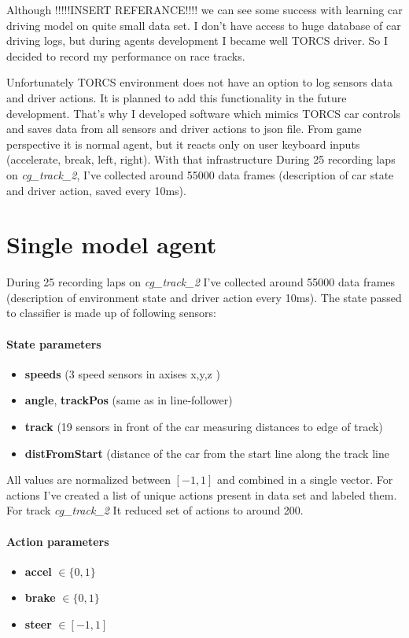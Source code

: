 \documentclass[declaration,shortabstract,english,inz]{iithesis}
\begin{document}
Although  !!!!!INSERT REFERANCE!!!! we can see some success with learning car driving model on quite small data set. I don't have access to huge database of car driving logs, but during agents development I became well TORCS driver. So I decided to record my performance on race tracks.

Unfortunately TORCS environment does not have an option to log sensors data and driver actions. It is planned to add this functionality in the future development. That's why I developed software which mimics TORCS car controls and saves data from all sensors and driver actions to json file. From game perspective it is normal agent, but it reacts only on user keyboard inputs (accelerate, break, left, right).  With that infrastructure During 25 recording laps on \textit{cg\_track\_2}, I've collected around 55000 data frames (description of car state and driver action, saved every 10ms).

\section{Single model agent}




During 25 recording laps on \textit{cg\_track\_2} I've collected around 55000 data frames (description of environment state and driver action every 10ms). The state passed to classifier is made up of following sensors:

\paragraph{State parameters}
\begin{itemize}
    \item \textbf{speeds} (3 speed sensors in axises x,y,z )
    \item \textbf{angle}, \textbf{trackPos} (same as in line-follower) 
    \item \textbf{track}  (19 sensors in front of the car measuring distances to edge of track) 
    \item \textbf{distFromStart} (distance of the car from the start line along the track line
\end{itemize}

All values are normalized between $[-1,1]$ and combined in a single vector. For actions I've created a list of unique actions present in data set and labeled them. For track \textit{cg\_track\_2} It reduced set of actions to around 200. 

\paragraph{Action parameters}
\begin{itemize}
    \item \textbf{accel} $\in \{0,1\}$
    \item \textbf{brake} $\in \{0,1\}$ 
    \item \textbf{steer} $\in [-1,1]$
\end{itemize}
\end{document}
